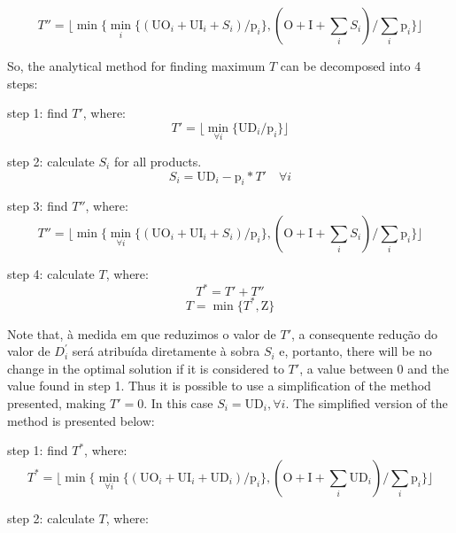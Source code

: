 \documentclass[authoryear,manuscript,12pt]{elsarticle}
\begin{document}
\begin{equation}
\label{eq:s15}
 T'' = \lfloor\min\{\min_i\{ (\textrm{UO}_i + \textrm{UI}_i + S_i) / \textrm{p}_i\}, (\textrm{O} + \textrm{I} + \sum_i S_i) / \sum_i \textrm{p}_i \}\rfloor
\end{equation}

So, the analytical method for finding maximum $T$ can be decomposed into 4 steps:

step 1: find $T'$, where:
\begin{equation}
T' = \lfloor{\min_{\forall i} \{\textrm{UD}_i / \textrm{p}_i\}}\rfloor
\end{equation}

step 2: calculate $S_i$ for all products.
\begin{equation}
\label{eq:unmet}
S_i = \textrm{UD}_i - \textrm{p}_i * T' \quad \forall i
\end{equation}

step 3: find $T''$, where:
\begin{equation}
T'' = \lfloor{\min \{\min_{\forall i} \{(\textrm{UO}_i + \textrm{UI}_i + S_i) / \textrm{p}_i\},(\textrm{O} + \textrm{I} + \sum_i {S_i}) / \sum_i {\textrm{p}_i}\}}\rfloor
\end{equation}

step 4: calculate $T$, where: 
\begin{equation}
T^* = T' + T''
\end{equation}
\begin{equation}
T = \min \{T^* , \textrm{Z}\}
\end{equation}

Note that, à medida em que reduzimos o valor de $T'$, a consequente redução do valor de $D_{i}^{'}$ será atribuída diretamente à sobra $S_i$ e, portanto, there will be no change in the optimal solution if it is considered to $T'$, a value between 0 and the value found in step 1. Thus it is possible to use a simplification of the method presented, making $T' = 0$. In this case $S_i = \textrm{UD}_i, \forall i$. The simplified version of the method is presented below:

step 1: find $T^*$, where:
\begin{equation}
T^* = \lfloor{\min \{\min_{\forall i} \{(\textrm{UO}_i + \textrm{UI}_i + \textrm{UD}_i) / \textrm{p}_i\},(\textrm{O} + \textrm{I} + \sum_i \textrm{UD}_i) / \sum_i {\textrm{p}_i}\}}\rfloor
\end{equation}

step 2: calculate $T$, where: 
\end{document}
